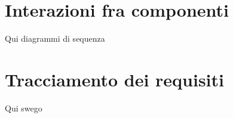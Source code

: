 \section{Interazioni fra componenti}
\label{sec:Interazioni}
Qui diagrammi di sequenza

\section{Tracciamento dei requisiti}
\label{sec:Tracciamento}
Qui swego 
